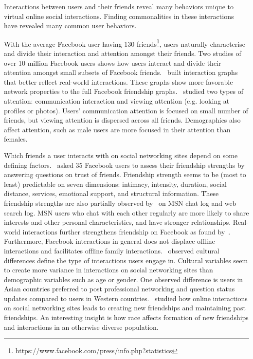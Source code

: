 
Interactions between users and their friends reveal many behaviors unique to virtual online social interactions. Finding commonalities in these interactions have revealed many common user behaviors.


With the average Facebook user having 130 friends\footnote{https://www.facebook.com/press/info.php?statistics}, users naturally characterise and divide their interaction and attention amongst their friends. Two studies of over 10 million Facebook users shows how users interact and divide their attention amongst small subsets of Facebook friends.~\cite{wilson2009user} built interaction graphs that better reflect real-world interactions. These graphs show more favorable network properties to the full Facebook friendship graphs.~\cite{backstrom2011center} studied two types of attention: communication interaction and viewing attention (e.g. looking at profiles or photos). Users' communication attention is focused on small number of friends, but viewing attention is dispersed across all friends. Demographics also affect attention, such as male users are more focused in their attention than females. 


Which friends a user interacts with on social networking sites depend on some defining factors.~\cite{gilbert2009predicting} asked 35 Facebook users to assess their friendship strengths by answering questions on trust of friends. Friendship strength seems to be (most to least) predictable on seven dimensions: intimacy, intensity, duration, social distance, services, emotional support, and structural information. These friendship strengths are also partially observed by~\cite{singla2008yes} on MSN chat log and web search log. MSN users who chat with each other regularly are more likely to share interests and other personal characteristics, and have stronger relationships. Real-world interactions further strengthens friendship on Facebook as found by~\cite{brandtzag2011facebook}. Furthermore, Facebook interactions in general does not displace offline interactions and facilitates offline family interactions.~\cite{yang2011culture} observed cultural differences define the type of interactions users engage in. Cultural variables seem to create more variance in interactions on social networking sites than demographic variables such as age or gender. One observed difference is users in Asian countries preferred to post professional networking and question status updates compared to users in Western countries.~\cite{tufekci2010who} studied how online interactions on social networking sites leads to creating new friendships and maintaining past friendships. An interesting insight is how race affects formation of new friendships and interactions in an otherwise diverse population.


